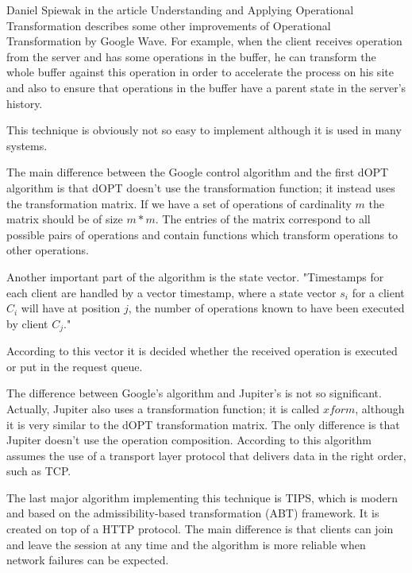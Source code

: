 \documentclass[12pt,oneside]{fithesis2}
\begin{document}
\par Daniel Spiewak in the article Understanding and Applying Operational Transformation \cite{Spiewak} describes some other improvements of Operational Transformation by Google Wave. For example, when the client receives operation from the server and has some operations in the buffer, he can transform the whole buffer against this operation in order to accelerate the process on his site and also to ensure that operations in the buffer have a parent state in the server's history.
\par This technique is obviously not so easy to implement although it is used in many systems.
\par The main difference between the Google control algorithm and the first dOPT algorithm is that dOPT doesn't use the transformation function; it instead uses the transformation matrix. If we have a set of operations of cardinality \(m\) the matrix should be of size \(m * m\). The entries of the matrix correspond to all possible pairs of operations and contain functions which transform operations to other operations. \par Another important part of the algorithm is the state vector. "Time\-stamps for each client are handled by a vector timestamp, where a state vector \(s_i\) for a client \(C_i \) will have at position \(j\), the number of operations known to have been executed by client \(C_j\)." \cite{Leung} \par According to this vector it is decided whether the received operation is executed or put in the request queue.
\par The difference between Google's algorithm and Jupiter's is not so significant. Actually, Jupiter also uses a transformation function; it is called \(xform\), although it is very similar to the dOPT transformation matrix. The only difference is that Jupiter doesn't use the operation composition. According to \cite{Jupiter} this algorithm assumes the use of a transport layer protocol that delivers data in the right order, such as TCP.
\par The last major algorithm implementing this technique is TIPS, which is modern and based on the admissibility-based transformation (ABT) framework. It is created on top of a HTTP protocol. The main difference is that clients can join and leave the session at any time and the algorithm is more reliable when network failures can be expected. 
\end{document}
